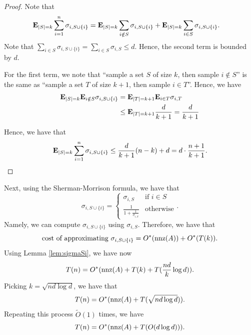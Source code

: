 \begin{proof}
Note that
\begin{align*}
\mathbf{E}_{|S|=k}\sum^{n}_{i=1}\sigma_{i,S\cup\{i\}} & =\mathbf{E}_{|S|=k}\sum_{i\notin S}\sigma_{i,S\cup\{i\}}+\mathbf{E}_{|S|=k}\sum_{i\in S}\sigma_{i,S\cup\{i\}}.
\end{align*}
Note that $\sum_{i\in S}\sigma_{i,S\cup\{i\}}=\sum_{i\in S}\sigma_{i,S}\leq d$.
Hence, the second term is bounded by $d$. 

For the first term, we note that ``sample a set $S$ of size $k$,
then sample $i\notin S$'' is the same as ``sample a set $T$ of
size $k+1$, then sample $i\in T$''. Hence, we have
\begin{align*}
\mathbf{E}_{|S|=k}\mathbf{E}_{i\notin S}\sigma_{i,S\cup\{i\}} & =\mathbf{E}_{|T|=k+1}\mathbf{E}_{i\in T}\sigma_{i,T}\\
 & \leq\mathbf{E}_{|T|=k+1}\frac{d}{k+1}=\frac{d}{k+1}
\end{align*}

Hence, we have that
\[
\mathbf{E}_{|S|=k}\sum^{n}_{i=1}\sigma_{i,S\cup\{i\}}\leq\frac{d}{k+1}(n-k)+d=d\cdot\frac{n+1}{k+1}.
\]
\end{proof}
Next, using the Sherman-Morrison formula, we have that
\[
\sigma_{i,S\cup\{i\}}=\begin{cases}
\sigma_{i,S} & \text{if }i\in S\\
\frac{1}{1+\frac{1}{\sigma_{i,S}}} & \mbox{otherwise}
\end{cases}.
\]
Namely, we can compute $\sigma_{i,S\cup\{i\}}$ using $\sigma_{i,S}$.
Therefore, we have that
\[
\text{cost of approximating }\sigma_{i,S\cup\{i\}}=O^{*}(\mathrm{nnz}(A))+O^{*}(T(k)).
\]
Using Lemma \ref{lem:sigmaSi}, we have now
\[
T(n)=O^{*}(\mathrm{nnz}(A)+T(k)+T(\frac{nd}{k}\log d)).
\]
Picking $k=\sqrt{nd\log d}$, we have that
\[
T(n)=O^{*}(\mathrm{nnz}(A)+T(\sqrt{nd\log d})).
\]
Repeating this process $\tilde{O}(1)$ times, we have
\[
T(n)=O^{*}(\mathrm{nnz}(A)+T(O(d\log d))).
\]


